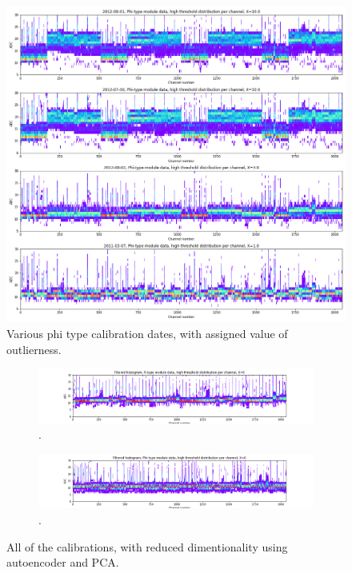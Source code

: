 \begin{figure}
    \centering
    \includegraphics[width=0.6\linewidth]{figures/chapter4/calib_analysis/P2-all-bad-cals-phi.png}
     \caption{Various phi type calibration dates, with assigned value of outlierness.}
    \label{plot:all-bad-phi}
\end{figure}


\begin{figure}
    \centering
    
    \begin{subfigure}[b]{\textwidth}
    \includegraphics[width=\linewidth]{figures/chapter4/calib_analysis/P2-only-good-R.png}
    \caption{ .}
   \label{plot:only_good_r}
  \end{subfigure}
  
  \begin{subfigure}[b]{\textwidth}
    \includegraphics[width=\linewidth]{figures/chapter4/calib_analysis/P2-only-good-phi.png}
    \caption{ .}
   \label{plot:only_good_phi}
  \end{subfigure}
      \caption[All calond]{All of the calibrations, with reduced dimentionality using autoencoder and PCA.}
    \label{plot:only_good_all}
  
  \end{figure}



